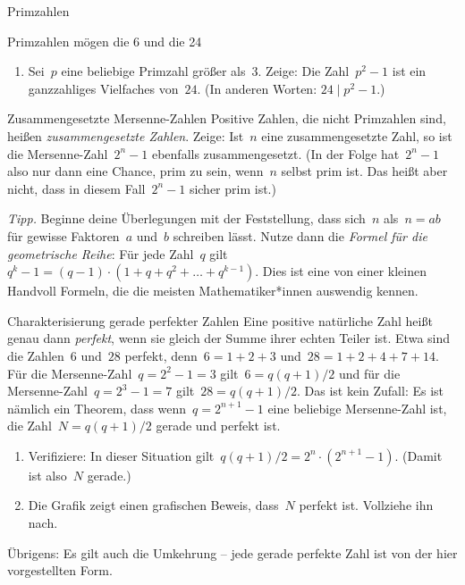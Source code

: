 \documentclass{uebblatt}
\begin{document}
\begin{blatt}{Primzahlen}
\begin{aufgabe}{Primzahlen mögen die 6 und die 24}
\begin{enumerate}
{\scriptsize\emph{Tipp.} Eine Zahl ist genau dann ein Vielfaches von~$6$, wenn sie ein
Vielfaches von~$2$ und von~$3$ ist. Weißt du von den drei Zahlen~$p-1$,~$p$
und~$p+1$, ob sie ein Vielfaches von~$3$ sind?\par}

\item Sei~$p$ eine beliebige Primzahl größer als~$3$.
Zeige: Die Zahl~$p^2 - 1$ ist ein ganzzahliges Vielfaches von~$24$.
(In anderen Worten: $24 \mid p^2 - 1$.)
\end{enumerate}
\end{aufgabe}

\begin{aufgabe}{Zusammengesetzte Mersenne-Zahlen}
Positive Zahlen, die nicht Primzahlen sind, heißen \emph{zusammengesetzte
Zahlen}. Zeige: Ist~$n$ eine zusammengesetzte Zahl, so ist die
Mersenne-Zahl~$2^n - 1$ ebenfalls zusammengesetzt. (In der Folge hat~$2^n - 1$
also nur dann eine Chance, prim zu sein, wenn~$n$ selbst prim ist. Das heißt
aber nicht, dass in diesem Fall~$2^n-1$ sicher prim ist.)

{\scriptsize\emph{Tipp.} Beginne deine Überlegungen mit der Feststellung,
dass sich~$n$ als~$n = ab$ für gewisse Faktoren~$a$ und~$b$ schreiben lässt.
Nutze dann die \emph{Formel für die geometrische Reihe}: Für jede Zahl~$q$
gilt~$q^k - 1 = (q - 1) \cdot (1 + q + q^2 + \ldots + q^{k-1})$. Dies ist eine
von einer kleinen Handvoll Formeln, die die meisten Mathematiker*innen
auswendig kennen.\par}
\end{aufgabe}

\newpage
\begin{aufgabe}{Charakterisierung gerade perfekter Zahlen}
Eine positive natürliche Zahl heißt genau dann \emph{perfekt}, wenn sie gleich
der Summe ihrer echten Teiler ist. Etwa sind die Zahlen~$6$ und~$28$ perfekt,
denn~$6 = 1 + 2 + 3$ und~$28 = 1 + 2 + 4 + 7 + 14$. Für die Mersenne-Zahl~$q =
2^2 - 1 = 3$ gilt~$6 = q (q+1) / 2$ und für die Mersenne-Zahl~$q = 2^3 - 1 = 7$
gilt~$28 = q (q+1) / 2$. Das ist kein Zufall: Es ist nämlich ein Theorem, dass
wenn~$q = 2^{n+1} - 1$ eine beliebige Mersenne-Zahl ist, die Zahl~$N = q (q+1) / 2$
gerade und perfekt ist.
\begin{enumerate}
\item Verifiziere: In dieser Situation gilt~$q (q+1) / 2 = 2^n \cdot (2^{n+1} - 1)$.
(Damit ist also~$N$ gerade.)
\item Die Grafik zeigt einen grafischen Beweis, dass~$N$ perfekt ist. Vollziehe
ihn nach.
\end{enumerate}
Übrigens: Es gilt auch die Umkehrung -- jede gerade perfekte Zahl ist von der
hier vorgestellten Form.


\end{aufgabe}
\end{blatt}
\end{document}
